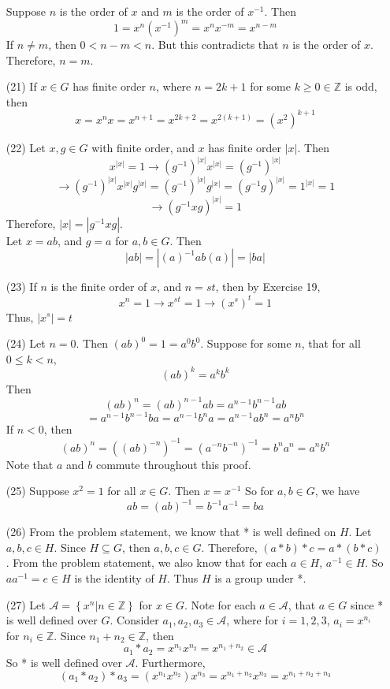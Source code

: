 \documentclass[12pt]{article}
\begin{document}
\begin{itemize}
Suppose $n$ is the order of $x$ and $m$ is the order of $x^{-1}$. Then
$$1 = x^n(x^{-1})^m = x^nx^{-m} = x^{n - m}$$
If $n \neq m$, then $0 < n - m < n$. But this contradicts that $n$ is the order of $x$. Therefore, $n = m$.
\item[(21)]
If $x \in G$ has finite order $n$, where $n = 2k + 1$ for some $k \geq 0 \in \mathbb{Z}$ is odd, then
$$x = x^nx = x^{n + 1} = x^{2k + 2} = x^{2(k + 1)} = (x^2)^{k + 1}$$
\item[(22)]
Let $x, g \in G$ with finite order, and $x$ has finite order $|x|$. Then
$$x^{|x|} = 1 \rightarrow (g^{-1})^{|x|}x^{|x|} = (g^{-1})^{|x|}$$
$$\rightarrow (g^{-1})^{|x|}x^{|x|}g^{|x|} = (g^{-1})^{|x|}g^{|x|} = (g^{-1}g)^{|x|} = 1^{|x|} = 1$$
$$\rightarrow (g^{-1}xg)^{|x|} = 1$$
Therefore, $|x| = |g^{-1}xg|$. \\
Let $x = ab$, and $g = a$ for $a, b \in G$. Then
$$|ab| = |(a)^{-1}ab(a)| = |ba|$$
\item[(23)]
If $n$ is the finite order of $x$, and $n = st$, then by Exercise 19,
$$x^n = 1 \rightarrow x^{st} = 1 \rightarrow (x^s)^t = 1$$
Thus, $|x^s| = t$
\item[(24)] Let $n = 0$. Then $(ab)^0 = 1 = a^0b^0$. Suppose for some $n$, that for all $0 \leq k < n$,
$$(ab)^k = a^kb^k$$
Then
$$(ab)^n = (ab)^{n - 1}ab = a^{n-1}b^{n-1}ab$$
$$= a^{n-1}b^{n-1}ba = a^{n-1}b^na = a^{n-1}ab^n = a^nb^n$$
If $n < 0$, then
$$(ab)^n = ((ab)^{-n})^{-1} = (a^{-n}b^{-n})^{-1} = b^na^n = a^nb^n$$
Note that $a$ and $b$ commute throughout this proof.
\item[(25)]
Suppose $x^2 = 1$ for all $x \in G$. Then $x = x^{-1}$ So for $a, b \in G$, we have
$$ab = (ab)^{-1} = b^{-1}a^{-1} = ba$$
\item[(26)]
From the problem statement, we know that * is well defined on $H$. Let $a, b, c \in H$. Since $H \subseteq G$, then $a, b, c \in G$. Therefore, $(a * b) * c = a * (b * c)$. From the problem statement, we also know that for each $a \in H$, $a^{-1} \in H$. So $aa^{-1} = e \in H$ is the identity of $H$. Thus $H$ is a group under *.
\item[(27)]
Let $\mathcal{A} = \left\lbrace x^n | n \in \mathbb{Z}\right\rbrace$ for $x \in G$. Note for each $a \in \mathcal{A}$, that $a \in G$ since * is well defined over $G$. Consider $a_1, a_2, a_3 \in \mathcal{A}$, where for $i = 1, 2, 3$, $a_i = x^{n_i}$ for $n_i \in \mathbb{Z}$. Since $n_1 + n_2 \in \mathbb{Z}$, then
$$a_1 * a_2 = x^{n_1}x^{n_2} = x^{n_1 + n_2} \in \mathcal{A}$$
So * is well defined over $\mathcal{A}$. Furthermore,
$$(a_1 * a_2) * a_3 = (x^{n_1}x^{n_2})x^{n_3} = x^{n_1 + n_2}x^{n_3} = x^{n_1 + n_2 + n_3}$$ 

\end{itemize}
\end{document}
